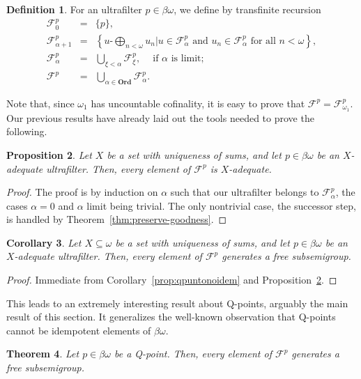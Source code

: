 \documentclass[10pt]{amsart}
\newcommand{\uadd}[2]{#1\text{-}\bigoplus_{#2<\omega}}
\newcommand{\cF}{\mathscr{F}}
\newcommand{\ord}{\mathbf{Ord}}
\newtheorem{theorem}{Theorem}[section]
\newtheorem{proposition}[theorem]{Proposition}
\newtheorem{corollary}[theorem]{Corollary}
\theoremstyle{definition}
\newtheorem{definition}[theorem]{Definition}
\theoremstyle{remark}
\begin{document}
\begin{definition}
     For an ultrafilter $p\in\beta\omega$, we define by transfinite recursion
    \begin{eqnarray*}
    \cF_0^p & = & \{p\}, \\
    \cF_{\alpha+1}^p & = & \left\{\uadd{u}{n}u_n\big|u\in\cF_\alpha^p\text{ and }u_n\in\cF_\alpha^p\text{ for all }n<\omega\right\}, \\
    \cF_\alpha^p & = & \bigcup_{\xi<\alpha}\cF_\xi^p,\ \ \ \ \text{ if }\alpha\text{ is limit}; \\
    \cF^p & = & \bigcup_{\alpha\in\ord}\cF_\alpha^p.
    \end{eqnarray*}
\end{definition}

Note that, since $\omega_1$ has uncountable cofinality, it is easy to prove that $\cF^p=\cF_{\omega_1}^p$. Our previous results have already laid out the tools needed to prove the following.

\begin{proposition}
\label{prop:sumassonqbuenas}
    Let $X$ be a set with uniqueness of sums, and let $p\in\beta\omega$ be an $X$-adequate ultrafilter. Then, every element of $\cF^p$ is $X$-adequate.
\end{proposition}
\begin{proof}
     The proof is by induction on $\alpha$ such that our ultrafilter belongs to $\cF_\alpha^p$, the cases $\alpha=0$ and $\alpha$ limit being trivial. The only nontrivial case, the successor step, is handled by Theorem~\ref{thm:preserve-goodness}.
\end{proof}

\begin{corollary}\label{cor:good-implies-noidem}
    Let $X\subseteq\omega$ be a set with uniqueness of sums, and let $p\in\beta\omega$ be an $X$-adequate ultrafilter. Then, every element of $\cF^p$ generates a free subsemigroup.
\end{corollary}

\begin{proof}
    Immediate from Corollary~\ref{prop:qpuntonoidem} and Proposition~\ref{prop:sumassonqbuenas}.
\end{proof}

This leads to an extremely interesting result about Q-points, arguably the main result of this section. It generalizes the well-known observation that Q-points cannot be idempotent elements of $\beta\omega$.

\begin{theorem}
\label{thm:nohayidem}
    Let $p\in\beta\omega$ be a Q-point. Then, every element of $\cF^p$ generates a free subsemigroup.
\end{theorem}
\end{document}
